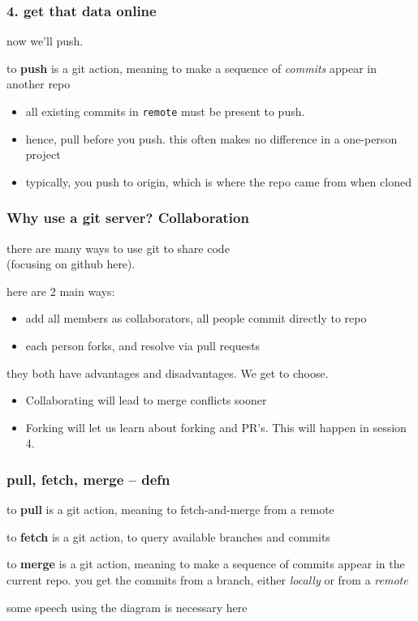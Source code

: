 \documentclass[14pt,aspectratio=1610]{beamer} %
\newcommand{\fframe}[2]{
   \begin{frame}
\frametitle{#1}
#2
\end{frame}
}
\begin{document}
\fframe{4. get that data online}
{
	now we'll push.
	\begin{definition}
to {\bf push} is a git action, meaning to make a sequence of {\em commits} appear in another repo
	\end{definition}

	\vspace{\baselineskip}

	\begin{itemize}
	\item all existing commits in {\tt remote} must be present to push.  
	\item hence, pull before you push.  this often makes no difference in a one-person project
	\item typically, you push to origin, which is where the repo came from when cloned
	\end{itemize}
}





\fframe{Why use a git server? Collaboration}
{

	there are many ways to use git to share code \\(focusing on github here).  


	\vspace{\baselineskip}
	here are 2 main ways:

\vspace{\baselineskip}
	\begin{itemize}
	\item add all members as collaborators, all people commit directly to repo
	\item each person forks, and resolve via pull requests
\end{itemize}

\vspace{\baselineskip}

they both have advantages and disadvantages.  We get to choose.  
	\begin{itemize}
	\item Collaborating will lead to merge conflicts sooner
	\item Forking will let us learn about forking and PR's.  This will happen in session 4.
\end{itemize}
}





\fframe{pull, fetch, merge -- defn}
{
\begin{definition}
to {\bf pull} is a git action, meaning to fetch-and-merge from a remote
	\end{definition}

	\begin{definition}
to {\bf fetch} is a git action, to query available branches and commits
	\end{definition}

\begin{definition}
to {\bf merge} is a git action, meaning to make a sequence of commits appear in the current repo.  you get the commits from a branch, either {\em locally} or from a {\em remote}
	\end{definition}

	some speech using the diagram is necessary here
}
\end{document}
